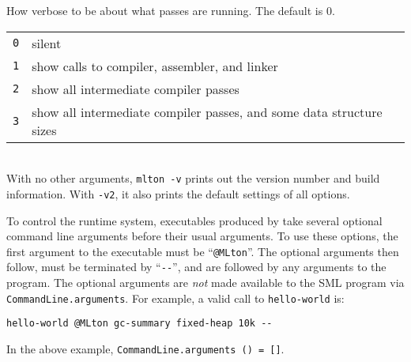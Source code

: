 \begin{description}
How verbose to be about what passes are running.  The default is 0.\\
\begin{tabular}{ll}
{\tt 0} & silent\\
{\tt 1} & show calls to compiler, assembler, and linker\\
{\tt 2} & show all intermediate compiler passes\\
{\tt 3} & show all intermediate compiler passes, and some data structure sizes\\
\end{tabular}\\
With no other arguments, {\tt mlton -v} prints out the version number and build
information.  With {\tt -v2}, it also prints the default settings of all options.

\end{description}

%
%
%
%
%
%


To control the runtime system, executables produced by {\mlton} take
several optional command line arguments before their usual arguments.
To use these options, the first argument to the executable must be
``\verb+@MLton+''.  The optional arguments then follow, must be
terminated by ``\verb+--+'', and are followed by any arguments to the program.
The optional arguments are {\em not} made available to the SML
program via {\tt CommandLine.arguments}.  For example, a valid call
to {\tt hello-world} is: 
\begin{verbatim}
hello-world @MLton gc-summary fixed-heap 10k --
\end{verbatim}
In the above example, {\tt CommandLine.arguments () = []}.


